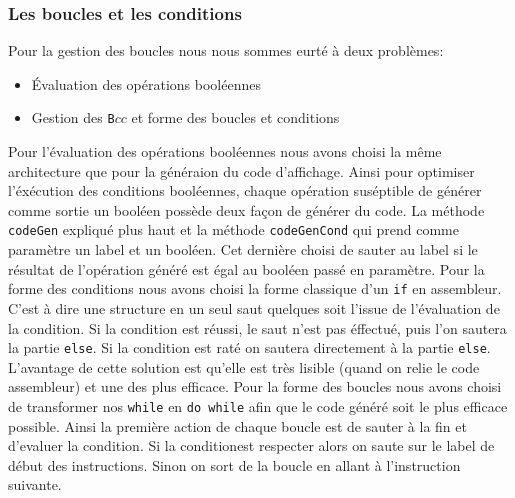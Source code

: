 \documentclass{article}
\begin{document}
\subsubsection{Les boucles et les conditions}
Pour la gestion des boucles nous nous sommes eurté à deux problèmes: 
\begin{itemize}
\item Évaluation des opérations booléennes 
\item Gestion des \texttt{B$cc$} et forme des boucles et conditions
\end{itemize}
Pour l'évaluation des opérations booléennes nous avons choisi la même architecture que pour la généraion du code d'affichage. Ainsi pour optimiser l'éxécution des conditions booléennes, chaque opération suséptible de générer comme sortie un booléen possède deux façon de générer du code. La méthode \texttt{codeGen} expliqué plus haut et la méthode \texttt{codeGenCond} qui prend comme paramètre un label et un booléen. Cet dernière choisi de sauter au label si le résultat de l'opération généré est égal au booléen passé en paramètre. 
\newline
Pour la forme des conditions nous avons choisi la forme classique d'un \texttt{if} en assembleur. C'est à dire une structure en un seul saut quelques soit l'issue de l'évaluation de la condition. Si la condition est réussi, le saut n'est pas éffectué, puis l'on sautera la partie \texttt{else}. Si la condition est raté on sautera directement à la partie \texttt{else}.  L'avantage de cette solution est qu'elle est très lisible (quand on relie le code assembleur) et une des plus efficace. 
\newline 
Pour la forme des boucles nous avons choisi de transformer nos \texttt{while} en \texttt{do while} afin que le code généré soit le plus efficace possible. Ainsi la première action de chaque boucle est de sauter à la fin et d'evaluer la condition. Si la conditionest respecter alors on saute sur le label de début des instructions. Sinon on sort de la boucle en allant à l'instruction suivante. 
\end{document}
